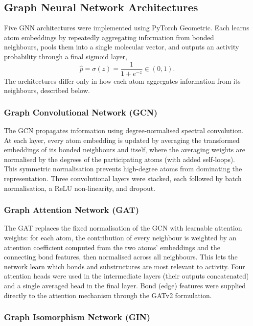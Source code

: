 \subsection{Graph Neural Network Architectures}

Five GNN architectures were implemented using PyTorch Geometric. Each learns atom
embeddings by repeatedly aggregating information from bonded neighbours, pools them
into a single molecular vector, and outputs an activity probability through a final
sigmoid layer,
\begin{equation}
\hat{p} = \sigma(z) = \frac{1}{1+e^{-z}} \in (0,1).
\end{equation}
The architectures differ only in how each atom aggregates information from its
neighbours, described below.

\subsubsection{Graph Convolutional Network (GCN)}

The GCN propagates information using degree-normalised spectral convolution. At
each layer, every atom embedding is updated by averaging the transformed
embeddings of its bonded neighbours and itself, where the averaging weights are
normalised by the degrees of the participating atoms (with added self-loops). This
symmetric normalisation prevents high-degree atoms from dominating the
representation. Three convolutional layers were stacked, each followed by batch
normalisation, a ReLU non-linearity, and dropout.

\subsubsection{Graph Attention Network (GAT)}

The GAT replaces the fixed normalisation of the GCN with learnable attention
weights: for each atom, the contribution of every neighbour is weighted by an
attention coefficient computed from the two atoms' embeddings and the connecting
bond features, then normalised across all neighbours. This lets the network learn
which bonds and substructures are most relevant to activity. Four attention heads
were used in the intermediate layers (their outputs concatenated) and a single
averaged head in the final layer. Bond (edge) features were supplied directly to
the attention mechanism through the GATv2 formulation.

\subsubsection{Graph Isomorphism Network (GIN)}

